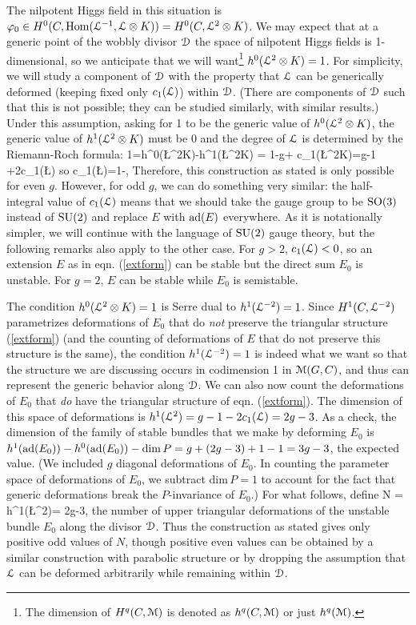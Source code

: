 \documentclass[11pt,a4paper]{article}
\begin{document}
The nilpotent Higgs field in this situation is $\varphi_0\in H^0(C,{\mathrm{Hom}}({\mathcal L}^{-1},{\mathcal L}\otimes K))=H^0(C, {\mathcal L}^2\otimes K)$.   We may expect that at a generic point of the wobbly divisor ${\mathcal D}$ the space of nilpotent Higgs fields is  1-dimensional, so we anticipate that we will want\footnote{The dimension of $H^q(C,{\mathcal M})$ is denoted as $h^q(C,{\mathcal M})$ or just $h^q({\mathcal M})$.} $h^0({\mathcal L}^2\otimes K)= 1$.  
For simplicity, we will study a component of ${\mathcal D}$ with the property that ${\mathcal L}$ can be generically deformed (keeping fixed only $c_1({\mathcal L})$) within ${\mathcal D}$.
(There are components of ${\mathcal D}$ such that this is not possible; they can be studied similarly, with similar results.)  
 Under this assumption, asking for  1  to be the generic value of $h^0({\mathcal L}^2\otimes K)$, 
 the generic value of $h^1({\mathcal L}^2\otimes K)$ must be 0 and the degree of ${\mathcal L}$ is determined by the Riemann-Roch formula:
\be\label{degl} 1=h^0(\L^2\otimes K)-h^1(\L^2\otimes K) = 1-g+ c_1(\L^2\otimes K)=g-1 +2c_1(\L)\ee
so
\be\label{egf}c_1(\L)=1-,\ee
Therefore, this construction as stated is only possible for even $g$.   However, for odd $g$, we can do something very similar: the half-integral value of $c_1({\mathcal L})$
means that we should take the gauge group to be ${\mathrm{SO}}(3)$ instead of ${\mathrm{SU}}(2)$ and replace $E$ with ${\mathrm{ad}}(E)$ everywhere.
  As it is notationally simpler, we will continue with the language of
${\mathrm{SU}}(2)$ gauge theory, but the following remarks also apply to the other case.
   For $g>2$, $c_1({\mathcal L})<0$, so an extension $E$ as in eqn. (\ref{extform}) can be stable but the direct sum $E_0$ is unstable.  For $g=2$, $E$ can be stable
   while $E_0$ is semistable.

The condition $h^0({\mathcal L}^2\otimes K)=1$ is Serre dual to $h^1({\mathcal L}^{-2})=1$.   Since $H^1(C,{\mathcal L}^{-2})$ parametrizes deformations of $E_0$ that do {\it not}
preserve the triangular structure (\ref{extform})    (and the counting of deformations of $E$ that do not preserve this structure is the same), the condition
$h^1({\mathcal L}^{-2})=1$ is indeed what we want so that the structure we are discussing occurs in codimension 1 in ${\mathcal M}(G,C)$, and thus can represent the generic behavior along ${\mathcal D}$.
We can also now count the deformations of $E_0$ that {\it do} have the triangular structure of eqn. (\ref{extform}).  
 The dimension of this space of deformations is
$h^1({\mathcal L}^2)=g-1-2c_1({\mathcal L}) =2g-3$.    As a check, the dimension of the family of stable bundles that we make by deforming $E_0$ is 
$h^1({\mathrm{ad}}(E_0)) - h^0({\mathrm{ad}}(E_0))-\mathrm{dim}\,P = g + (2g-3)+1 -1 =3g-3$, the expected value.  (We included $g$ diagonal deformations of $E_0$.
In counting the parameter space of deformations of $E_0$,
we subtract ${\mathrm{dim}}\,P=1$ to account for the fact that generic deformations break the $P$-invariance of $E_0$.)
For what follows, define
\be\label{weddo} N = h^1(\L^2)= 2g-3,\ee
the number of upper triangular deformations of the unstable bundle $E_0$ along the divisor ${\mathcal D}$.    Thus the construction as stated gives only positive odd values of $N$,
though positive even values can be obtained by a similar construction with parabolic structure or by dropping the assumption that ${\mathcal L}$ can be deformed
arbitrarily while remaining within ${\mathcal D}$.
\end{document}
